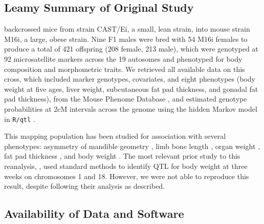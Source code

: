 \subsection{Leamy \etal Summary of Original Study}

\citet{Leamy2000} backcrossed mice from strain CAST/Ei, a small, lean strain, into mouse strain M16i, a large, obese strain.
Nine F1 males were bred with 54 M16i females to produce a total of 421 offspring (208 female, 213 male), which were genotyped at 92 microsatellite markers across the 19 autosomes and phenotyped for body composition and morphometric traits.
We retrieved all available data on this cross, which included marker genotypes, covariates, and eight phenotypes (body weight at five ages, liver weight, subcutaneous fat pad thickness, and gonadal fat pad thickness), from the Mouse Phenome Database \citep{Grubb2014a}, and estimated genotype probabilities at 2cM intervals across the genome using the hidden Markov model in \texttt{R/qtl} \citep{Broman2003}.

This mapping population has been studied for association with several phenotypes:
    asymmetry of mandible geometry \citep{Leamy2000},
    limb bone length \citep{Leamy2002,Wolf2006},
    organ weight \citep{Leamy2002,Wolf2006,Yi2006},
    fat pad thickness \citep{Yi2005,Yi2006,Yi2007},
    and body weight \citep{Yi2006}.
The most relevant prior study to this reanalysis, \cite{Yi2006}, used standard methods to identify QTL for body weight at three weeks on chromosomes 1 and 18. However, we were not able to reproduce this result, despite following their analysis as described.



\subsection{Availability of Data and Software}

